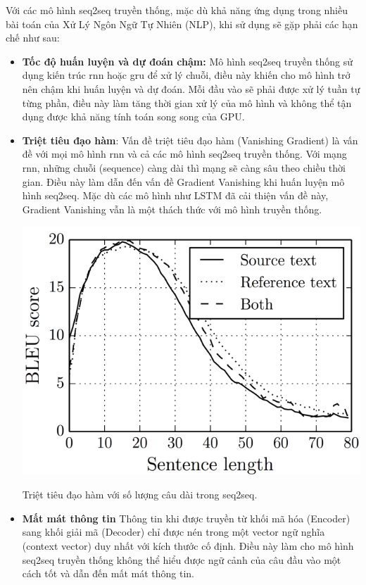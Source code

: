 \documentclass[a4paper, 12pt, openany]{book}
\begin{document}
Với các mô hình \acl{seq2seq} truyền thống, mặc dù khả năng ứng dụng trong nhiều bài toán của Xử Lý Ngôn Ngữ Tự Nhiên (NLP), khi sử dụng sẽ gặp phải các hạn chế như sau:

\begin{itemize}
    \item \textbf{Tốc độ huấn luyện và dự đoán chậm:} Mô hình \ac{seq2seq} truyền thống sử dụng kiến trúc \ac{rnn} hoặc \ac{gru} để xử lý chuỗi, điều này khiến cho mô hình trở nên chậm khi huấn luyện và dự đoán.
    Mỗi đầu vào sẽ phải được xử lý tuần tự từng phần, điều này làm tăng thời gian xử lý của mô hình và không thể tận dụng được khả năng tính toán song song của GPU.
    
    \item \textbf{Triệt tiêu đạo hàm}: Vấn đề triệt tiêu đạo hàm (Vanishing Gradient) là vấn đề với mọi mô hình \ac{rnn} và cả
    các mô hình \ac{seq2seq} truyền thống. Với mạng \ac{rnn}, những chuỗi (sequence) càng dài thì mạng sẽ càng sâu
    theo chiều thời gian. Điều này làm dẫn đến vấn đề Gradient Vanishing khi huấn luyện mô hình \ac{seq2seq}.
    Mặc dù các mô hình như LSTM đã cải thiện vấn đề này, Gradient Vanishing vẫn là một thách thức với mô hình truyền thống.

    \begin{minipage}{\linewidth}
        \captionsetup{type=figure}
        \centering
        \includegraphics[width=.8\linewidth]{./assets/images/seq2seq_limit.png}
        \caption{Triệt tiêu đạo hàm với số lượng câu dài trong \ac{seq2seq}.}
    \end{minipage}
    \vspace{0.5cm}

    \item \textbf{Mất mát thông tin} Thông tin khi được truyền từ khối mã hóa (Encoder) sang khối giải mã (Decoder)
    chỉ được nén trong một vector ngữ nghĩa (context vector) duy nhất với kích thước cố định.
    Điều này làm cho mô hình \ac{seq2seq} truyền thống không thể hiểu được ngữ cảnh của câu đầu vào một cách tốt và dẫn đến mất mát thông tin.


\end{itemize}
\end{document}

